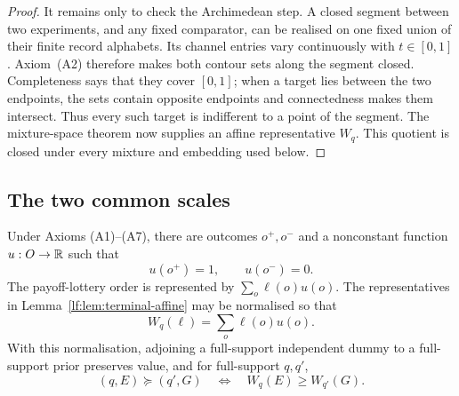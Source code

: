 \begin{proof}
It remains only to check the Archimedean step.  A closed segment between two
experiments, and any fixed comparator, can be realised on one fixed union of
their finite record alphabets.  Its channel entries vary continuously with
$t\in[0,1]$.
Axiom~\textup{(A2)} therefore makes both contour sets along the segment closed.
Completeness says that they cover $[0,1]$; when a target lies between the two
endpoints, the sets contain opposite endpoints and connectedness makes them
intersect.  Thus every such target is indifferent to a point of the segment.
The mixture-space theorem now supplies an affine representative $W_q$.  This
quotient is closed under every mixture and embedding used below.
\end{proof}

\subsection{The two common scales}

\begin{lemma}\label{lf:lem:material-scale}
Under Axioms \textup{(A1)--(A7)}, there are outcomes $o^+,o^-$ and a
nonconstant function $u:O\to\mathbb R$ such that
\[
u(o^+)=1,
\qquad
u(o^-)=0.
\]
The payoff-lottery order is represented by $\sum_o\ell(o)u(o)$.  The
representatives in Lemma~\ref{lf:lem:terminal-affine} may be normalised so that
\begin{equation}
W_q(\ell)=\sum_o\ell(o)u(o).
\label{lf:eq:payoff-normalisation}
\end{equation}
With this normalisation, adjoining a full-support independent dummy to a
full-support prior preserves value, and for full-support $q,q'$,
\begin{equation}
(q,E)\succeq(q',G)
\quad\Longleftrightarrow\quad
W_q(E)\ge W_{q'}(G).
\label{lf:eq:common-scale}
\end{equation}
\end{lemma}

